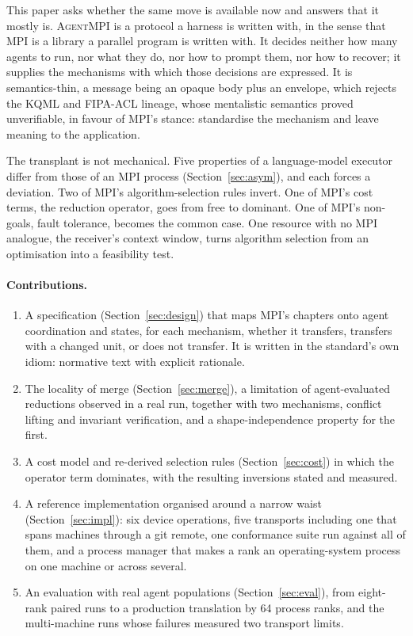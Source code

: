 \documentclass[sigconf,nonacm]{acmart}
\newcommand{\ampi}{\textsc{AgentMPI}\xspace}
\begin{document}
This paper asks whether the same move is available now and answers that it mostly
is. \ampi is a protocol a harness is written with, in the sense that MPI is a
library a parallel program is written with. It decides neither how many agents to
run, nor what they do, nor how to prompt them, nor how to recover; it supplies the
mechanisms with which those decisions are expressed. It is semantics-thin, a
message being an opaque body plus an envelope, which rejects the KQML and FIPA-ACL
lineage, whose mentalistic semantics proved unverifiable, in favour of MPI's
stance: standardise the mechanism and leave meaning to the application.

The transplant is not mechanical. Five properties of a language-model executor
differ from those of an MPI process (Section~\ref{sec:asym}), and each forces a
deviation. Two of MPI's algorithm-selection rules invert. One of MPI's cost terms,
the reduction operator, goes from free to dominant. One of MPI's non-goals, fault
tolerance, becomes the common case. One resource with no MPI analogue, the
receiver's context window, turns algorithm selection from an optimisation into a
feasibility test.

\paragraph{Contributions.}
\begin{enumerate}
\item A specification (Section~\ref{sec:design}) that maps MPI's chapters onto
agent coordination and states, for each mechanism, whether it transfers,
transfers with a changed unit, or does not transfer. It is written in the
standard's own idiom: normative text with explicit rationale.

\item The locality of merge (Section~\ref{sec:merge}), a limitation of
agent-evaluated reductions observed in a real run, together with two mechanisms,
conflict lifting and invariant verification, and a shape-independence property for
the first.

\item A cost model and re-derived selection rules (Section~\ref{sec:cost}) in
which the operator term dominates, with the resulting inversions stated and
measured.

\item A reference implementation organised around a narrow waist
(Section~\ref{sec:impl}): six device operations, five transports including one
that spans machines through a git remote, one conformance suite run against all
of them, and a process manager that makes a rank an operating-system process on
one machine or across several.

\item An evaluation with real agent populations (Section~\ref{sec:eval}), from
eight-rank paired runs to a production translation by 64 process ranks, and the
multi-machine runs whose failures measured two transport limits.
\end{enumerate}
\end{document}
